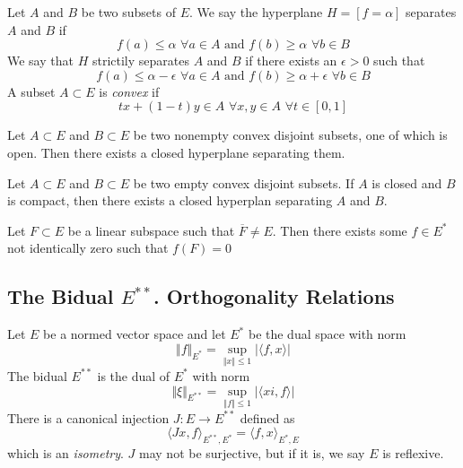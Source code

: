 \begin{defn}
Let $A$ and $B$ be two subsets of $E$. We say the hyperplane $H = \left[ f= \alpha \right]$ separates $A$ and $B$ if
\[
	f(a) \leq \alpha \hspace{4pt} \forall a \in A \text{ and } f(b) \geq \alpha \hspace{4pt} \forall b \in B
\]
We say that $H$ strictily separates $A$ and $B$ if there exists an $ \epsilon > 0$ such that
\[
	f(a) \leq \alpha - \epsilon \hspace{4pt} \forall a \in A \text{ and } f(b) \geq \alpha + \epsilon \hspace{4pt} \forall b \in B
\]
A subset $A \subset E$ is \textit{convex} if
\[
	tx + (1-t)y \in A \hspace{4pt} \forall x,y \in A \hspace{4pt} \forall t \in \left[ 0,1 \right]
\]
\end{defn}


\begin{thm}
Let $A \subset E$ and $B \subset E$ be two nonempty convex disjoint subsets, one of which is open. Then there exists a closed hyperplane separating them.
\end{thm}

\begin{thm}
Let $A \subset E$ and $B \subset E$ be two empty convex disjoint subsets. If $A$ is closed and $B$ is compact, then there exists a closed hyperplan separating $A$ and $B$.
\end{thm}

\begin{cor}
	Let $F \subset E$ be a linear subspace such that $ \overline{F} \neq E$. Then there exists some $ f \in E^*$ not identically zero such that $f(F)=0$
\end{cor}

\subsection{The Bidual $E^{**}$. Orthogonality Relations}

Let $E$ be a normed vector space and let $E^*$ be the dual space with norm
\[
\Vert f \Vert_{E^*} = \sup_{ \Vert x \Vert \leq 1} \vert \langle f,x \rangle \vert
\]
The bidual $E^{**}$ is the dual of $E^*$ with norm
\[
\Vert \xi \Vert_{E^{**}} = \sup_{ \Vert f \Vert \leq 1} \vert \langle xi,f \rangle \vert
\]
There is a canonical injection $J: E \to E^{**}$ defined as
\[
\langle Jx, f \rangle_{E^{**}, E^*} = \langle f,x \rangle_{E^*, E}
\]
which is an \textit{isometry}. $J$ may not be surjective, but if it is, we say $E$ is reflexive.

